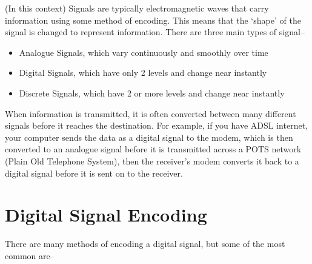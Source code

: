 (In this context) Signals are typically electromagnetic waves that carry information using some method of encoding.
 This means that the `shape' of the signal is changed to represent information. There are three main types of signal--

\begin{itemize}
  \item Analogue Signals, which vary continuously and smoothly over time
  \item Digital Signals, which have only 2 levels and change near instantly
  \item Discrete Signals, which have 2 or more levels and change near instantly
\end{itemize}

When information is transmitted, it is often converted between many different signals before it reaches the destination.
 For example, if you have ADSL internet, your computer sends the data as a digital signal to the modem, which is then
 converted to an analogue signal before it is transmitted across a POTS network (Plain Old Telephone System), then the
 receiver's modem converts it back to a digital signal before it is sent on to the receiver.

\section*{Digital Signal Encoding}

There are many methods of encoding a digital signal, but some of the most common are--

